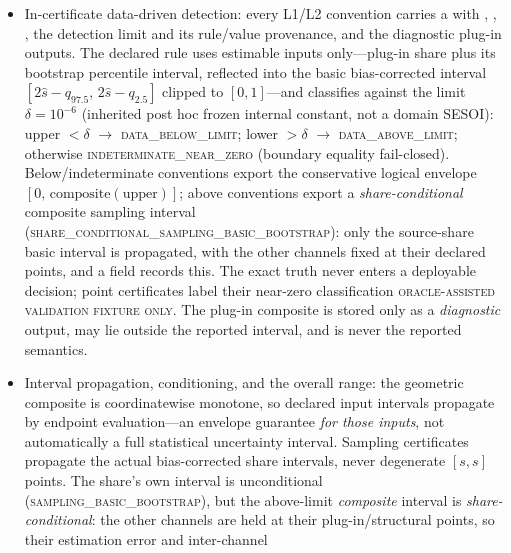 \begin{sloppypar}
\begin{itemize}
L1-style RNI/NRI/order-average decomposition is \emph{not} imposed on L0.
L1/L2 carry the registered partition's three order conventions with every
flow term, every registered alternative semantic partition, and the
aggregation weights (strictly positive interior). With zero total flow the
share is unidentifiable: the org channel is \textsc{interval} $[0,1]$
(logical envelope) and the composite is an interval.
\item In-certificate data-driven detection: every L1/L2 convention carries a
 with , ,
, the detection limit and its rule/value provenance,
and the diagnostic plug-in outputs. The declared rule uses estimable inputs
only---plug-in share plus its bootstrap percentile interval, reflected into
the basic bias-corrected interval $[2\hat s-q_{97.5},\,2\hat s-q_{2.5}]$
clipped to $[0,1]$---and classifies against the limit $\delta=10^{-6}$
(inherited post hoc frozen internal constant, not a domain SESOI): upper
$<\delta$ $\to$ \textsc{data\_below\_limit}; lower $>\delta$ $\to$
\textsc{data\_above\_limit}; otherwise \textsc{indeterminate\_near\_zero}
(boundary equality fail-closed). Below/indeterminate conventions export the
conservative logical envelope $[0,\,\text{composite}(\text{upper})]$; above
conventions export a \emph{share-conditional} composite sampling interval
(\textsc{share\_conditional\_sampling\_basic\_bootstrap}): only the source-share
basic interval is propagated, with the other channels fixed at their declared
points, and a  field records this. The exact truth never
enters a deployable decision; point certificates label their near-zero
classification \textsc{oracle-assisted validation fixture only}. The plug-in
composite is stored only as a \emph{diagnostic} output, may lie outside the
reported interval, and is never the reported semantics.
\item Interval propagation, conditioning, and the overall range: the geometric
composite is coordinatewise monotone, so declared input intervals propagate by
endpoint evaluation---an envelope guarantee \emph{for those inputs}, not
automatically a full statistical uncertainty interval. Sampling certificates
propagate the actual bias-corrected share intervals, never degenerate $[s,s]$
points. The share's own interval is unconditional
(\textsc{sampling\_basic\_bootstrap}), but the above-limit \emph{composite}
interval is \emph{share-conditional}: the other channels are held at their
plug-in/structural points, so their estimation error and inter-channel

\end{itemize}
\end{sloppypar}
